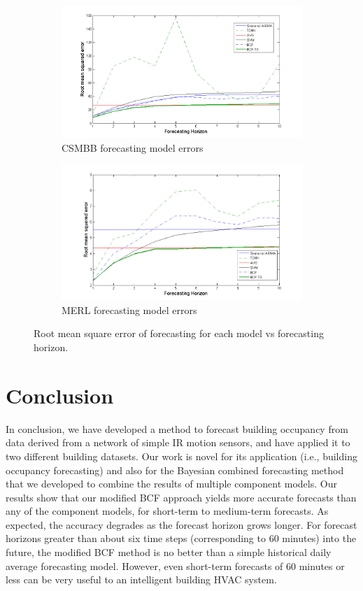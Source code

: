 \documentclass{acm_proc_article-sp}
\begin{document}
\begin{figure}
\centering
\begin{subfigure}{.49\textwidth}
  \centering
  \includegraphics[width=1.0\linewidth]{brown_rmse.png}
  \caption{CSMBB forecasting model errors}
  \label{fig:csmrmse}
\end{subfigure}
\begin{subfigure}{.49\textwidth}
  \centering
  \includegraphics[width=1.0\linewidth]{merl_rmse.png}
  \caption{MERL forecasting model errors}
  \label{fig:merlrmse}
\end{subfigure}
\caption{Root mean square error of forecasting for each model vs forecasting horizon.}
\label{fig:rmseplot}
\end{figure}

\section{Conclusion}
In conclusion, we have developed a method to forecast building occupancy from data derived from a network of simple IR motion sensors, and have applied it to two different building datasets.  Our work is novel for its application (i.e., building occupancy forecasting) and also for the Bayesian combined forecasting method that we developed to combine the results of multiple component models.  Our results show that our modified BCF approach yields more accurate forecasts than any of the component models, for short-term to medium-term forecasts.  As expected, the accuracy degrades as the forecast horizon grows longer.  For forecast horizons greater than about six time steps (corresponding to 60 minutes) into the future, the modified BCF method is no better than a simple historical daily average forecasting model.  However, even short-term forecasts of 60 minutes or less can be very useful to an intelligent building HVAC system.
\end{document}
